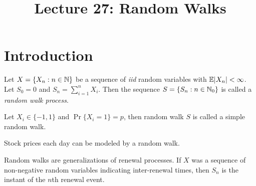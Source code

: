 \documentclass[a4paper,10pt,english]{article}
\title{Lecture 27: Random Walks}
\author{}
\begin{document}
\maketitle
\section{Introduction}
Let $X = \{X_n: n \in \mathbb{N}\}$ be a sequence of \textit{iid} random variables with $\mathbb{E}|X_n| < \infty$. 
Let $S_0 = 0$ and $S_n = \sum_{i=1}^nX_i$. 
Then the sequence $S = \{S_n: n \in \mathbb{N}_0\}$ is called a \textit{random walk process}. 
\begin{shaded*}
\begin{exmp} 
Let $X_i \in \{-1,1\}$ and $\Pr\{X_i = 1\} = p$, then random walk $S$ is called a simple random walk. 
\end{exmp}
\begin{exmp}
Stock prices each day can be modeled by a random walk. 
\end{exmp}
\end{shaded*}
Random walks are generalizations of renewal processes. 
If $X$ was a sequence of non-negative random variables indicating inter-renewal times, 
then $S_n$ is the instant of the $n$th renewal event. 
\end{document}
